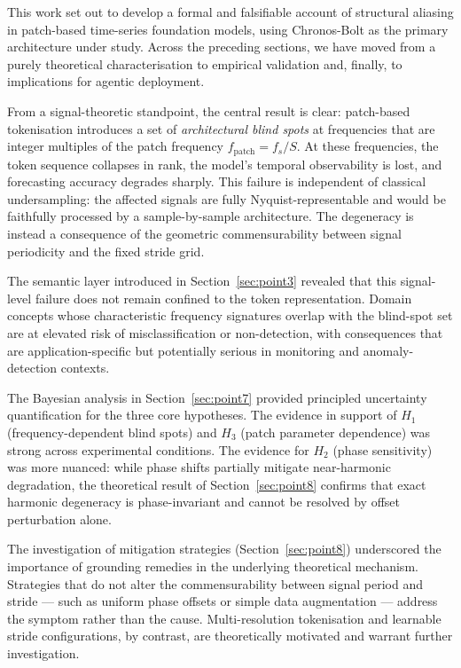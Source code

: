 This work set out to develop a formal and falsifiable account of structural aliasing in patch-based time-series foundation models, using Chronos-Bolt as the primary architecture under study.
Across the preceding sections, we have moved from a purely theoretical characterisation to empirical validation and, finally, to implications for agentic deployment.

From a signal-theoretic standpoint, the central result is clear: patch-based tokenisation introduces a set of \emph{architectural blind spots} at frequencies that are integer multiples of the patch frequency $f_{\mathrm{patch}} = f_s / S$.
At these frequencies, the token sequence collapses in rank, the model's temporal observability is lost, and forecasting accuracy degrades sharply.
This failure is independent of classical undersampling: the affected signals are fully Nyquist-representable and would be faithfully processed by a sample-by-sample architecture.
The degeneracy is instead a consequence of the geometric commensurability between signal periodicity and the fixed stride grid.

The semantic layer introduced in Section~\ref{sec:point3} revealed that this signal-level failure does not remain confined to the token representation.
Domain concepts whose characteristic frequency signatures overlap with the blind-spot set are at elevated risk of misclassification or non-detection, with consequences that are application-specific but potentially serious in monitoring and anomaly-detection contexts.

The Bayesian analysis in Section~\ref{sec:point7} provided principled uncertainty quantification for the three core hypotheses.
The evidence in support of $H_1$ (frequency-dependent blind spots) and $H_3$ (patch parameter dependence) was strong across experimental conditions.
The evidence for $H_2$ (phase sensitivity) was more nuanced: while phase shifts partially mitigate near-harmonic degradation, the theoretical result of Section~\ref{sec:point8} confirms that exact harmonic degeneracy is phase-invariant and cannot be resolved by offset perturbation alone.

The investigation of mitigation strategies (Section~\ref{sec:point8}) underscored the importance of grounding remedies in the underlying theoretical mechanism.
Strategies that do not alter the commensurability between signal period and stride — such as uniform phase offsets or simple data augmentation — address the symptom rather than the cause.
Multi-resolution tokenisation and learnable stride configurations, by contrast, are theoretically motivated and warrant further investigation.

